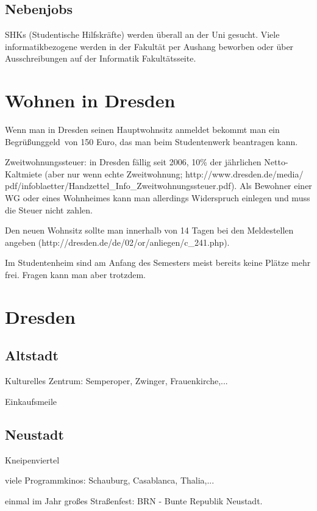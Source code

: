 \documentclass[a4paper,12pt]{report}
\begin{document}
\subsection{Nebenjobs}
SHKs (Studentische Hilfskräfte) werden überall an der Uni gesucht. Viele informatikbezogene werden in der Fakultät per Aushang beworben oder über Ausschreibungen auf der Informatik Fakultätsseite.

\section{Wohnen in Dresden}
\begin{itemize*}
	\item Wenn man in Dresden seinen Hauptwohnsitz anmeldet bekommt man ein \glqq Begrüßunggeld\grqq\ von 150 Euro, das man beim Studentenwerk beantragen kann.
	\item Zweitwohnungssteuer: in Dresden fällig seit 2006, 10\% der jährlichen Netto-Kaltmiete (aber nur wenn echte Zweitwohnung; http://www.dresden.de/media/ pdf/infoblaetter/Handzettel\_Info\_Zweitwohnungssteuer.pdf). Als Bewohner einer WG oder eines Wohnheimes kann man allerdings Widerspruch einlegen und muss die Steuer nicht zahlen.
	\item Den neuen Wohnsitz sollte man innerhalb von 14 Tagen bei den Meldestellen angeben (http://dresden.de/de/02/or/anliegen/c\_241.php).
	\item Im Studentenheim sind am Anfang des Semesters meist bereits keine Plätze mehr frei. Fragen kann man aber trotzdem.
\end{itemize*}

\section{Dresden}

\subsection{Altstadt}
\begin{itemize*}
\item Kulturelles Zentrum: Semperoper, Zwinger, Frauenkirche,...
\item Einkaufsmeile
\end{itemize*}

\subsection{Neustadt}
\begin{itemize*}
\item Kneipenviertel
\item viele Programmkinos: Schauburg, Casablanca, Thalia,...
\item einmal im Jahr großes Straßenfest: BRN - Bunte Republik Neustadt.
\end{itemize*}
\end{document}
